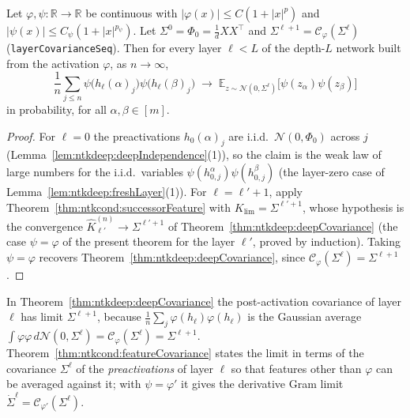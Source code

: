 \begin{theorem}\label{thm:ntkcond:featureCovariance}
  \leanok
Let $\varphi,\psi:\mathbb R\to\mathbb R$ be continuous with $|\varphi(x)|\le C(1+|x|^p)$ and $|\psi(x)|\le C_\psi(1+|x|^{p_\psi})$. Let $\Sigma^0=\Phi_0=\frac1d XX^\top$ and $\Sigma^{\ell+1}=\mathcal C_\varphi(\Sigma^\ell)$ (\texttt{layerCovarianceSeq}). Then for every layer $\ell<L$ of the depth-$L$ network built from the activation $\varphi$, as $n\to\infty$,
\[
  \frac1n\sum_{j\le n}\psi\bigl(h_\ell(\alpha)_j\bigr)\psi\bigl(h_\ell(\beta)_j\bigr)\;\longrightarrow\;\mathbb E_{z\sim\mathcal N(0,\Sigma^\ell)}\bigl[\psi(z_\alpha)\psi(z_\beta)\bigr]
\]
in probability, for all $\alpha,\beta\in[m]$.
\end{theorem}

\begin{proof}
  \leanok
For $\ell=0$ the preactivations $h_0(\alpha)_j$ are i.i.d.\ $\mathcal N(0,\Phi_0)$ across $j$ (Lemma~\ref{lem:ntkdeep:deepIndependence}(1)), so the claim is the weak law of large numbers for the i.i.d.\ variables $\psi(h_{0,j}^\alpha)\psi(h_{0,j}^\beta)$ (the layer-zero case of Lemma~\ref{lem:ntkdeep:freshLayer}(1)). For $\ell=\ell'+1$, apply Theorem~\ref{thm:ntkcond:successorFeature} with $K_{\lim}=\Sigma^{\ell'+1}$, whose hypothesis is the convergence $\hat K^{(n)}_{\ell'}\to\Sigma^{\ell'+1}$ of Theorem~\ref{thm:ntkdeep:deepCovariance} (the case $\psi=\varphi$ of the present theorem for the layer $\ell'$, proved by induction). Taking $\psi=\varphi$ recovers Theorem~\ref{thm:ntkdeep:deepCovariance}, since $\mathcal C_\varphi(\Sigma^{\ell})=\Sigma^{\ell+1}$.
\end{proof}

\begin{remark}[Indexing]\label{rmk:ntkcond:indexing}
In Theorem~\ref{thm:ntkdeep:deepCovariance} the post-activation covariance of layer $\ell$ has limit $\Sigma^{\ell+1}$, because $\frac1n\sum_j\varphi(h_\ell)\varphi(h_\ell)$ is the Gaussian average $\int\varphi\varphi\,d\mathcal N(0,\Sigma^\ell)=\mathcal C_\varphi(\Sigma^\ell)=\Sigma^{\ell+1}$. Theorem~\ref{thm:ntkcond:featureCovariance} states the limit in terms of the covariance $\Sigma^\ell$ of the \emph{preactivations} of layer $\ell$ so that features other than $\varphi$ can be averaged against it; with $\psi=\varphi'$ it gives the derivative Gram limit $\dot\Sigma^\ell=\mathcal C_{\varphi'}(\Sigma^\ell)$.
\end{remark}
